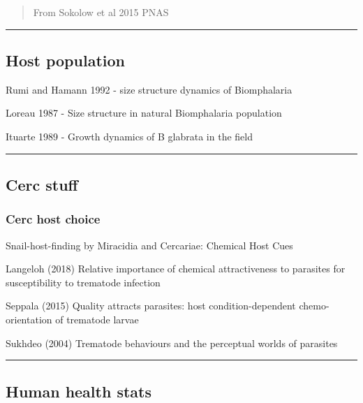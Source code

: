 \documentclass[10,portrait]{article}
\begin{document}
\begin{quote}
From Sokolow et al 2015 PNAS
\end{quote}

\newpage  

\begin{center}\rule{0.5\linewidth}{\linethickness}\end{center}

\subsection{Host population}\label{host-population}

Rumi and Hamann 1992 - size structure dynamics of Biomphalaria

Loreau 1987 - Size structure in natural Biomphalaria population

Ituarte 1989 - Growth dynamics of B glabrata in the field

\newpage    

\begin{center}\rule{0.5\linewidth}{\linethickness}\end{center}

\subsection{Cerc stuff}\label{cerc-stuff}

\subsubsection{Cerc host choice}\label{cerc-host-choice}

Snail-host-finding by Miracidia and Cercariae: Chemical Host Cues

Langeloh (2018) Relative importance of chemical attractiveness to
parasites for susceptibility to trematode infection

Seppala (2015) Quality attracts parasites: host condition-dependent
chemo-orientation of trematode larvae

Sukhdeo (2004) Trematode behaviours and the perceptual worlds of
parasites

\newpage  

\begin{center}\rule{0.5\linewidth}{\linethickness}\end{center}

\subsection{Human health stats}\label{human-health-stats}
\end{document}
